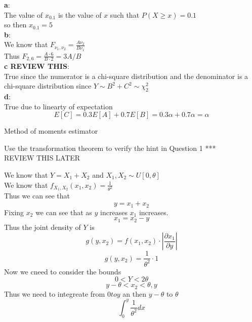 \documentclass[answers,12pt,addpoints]{exam}
\begin{document}
\begin{questions}
    
    \begin{solution}
        \textbf{a}:\\
        The value of $x_{0.1}$ is the value of $x$ such that $P(X \geq x) = 0.1$\\
        so then $x_{0.1} = 5$\\

        \textbf{b}:\\
        We know that $F_{\nu_1, \nu_2} = \frac{A \nu_2}{B \nu_1}$\\
        Thus $F_{2,6} = \frac{A \cdot 6}{B \cdot 2} = 3A/B$\\

        \textbf{c REVIEW THIS}:\\
        True since the numerator is a chi-square distribution and the denominator is a chi-square distribution since $Y \sim B^2 + C^2 \sim \chi^2_2$\\

        \textbf{d}:\\
        True due to linearty of expectation
        $$ E[C] = 0.3E[A] + 0.7E[B] = 0.3\alpha + 0.7\alpha = \alpha$$
    \end{solution}

    \question[10] Method of moments estimator

    \question[10] Use the transformation theorem to verify the hint in Question 1 ***\\
    REVIEW THIS LATER
    \begin{solution}
        We know that $Y = X_1 + X_2$ and $X_1, X_2 \sim U[0, \theta]$\\
        We know that $f_{X_1,X_2}(x_1, x_2) = \frac{1}{\theta^2}$\\
        Thus we can see that 
        $$ y = x_1 +x_2$$
        Fixing $x_2$ we can see that as $y$ increases $x_1$ increases. 
        $$x_1 = x_2 -y$$
        Thus the joint density of $Y$ is
        $$g(y,x_2) = f(x_1, x_2) \cdot |\frac{\partial x_1 }{ \partial y} |$$
        $$g(y,x_2) = \frac{1}{\theta^2} \cdot 1$$
        Now we cneed to consider the bounds
        $$ 0 < Y < 2\theta$$
        $$ y- \theta < x_2 < \theta, y$$
        Thus we need to integreate from $0 to y$ an then $y - \theta$ to $\theta$\\
        $$ \int_0^y \frac{1}{\theta^2}  dx$$
    \end{solution}
    

\end{questions}
\end{document}
